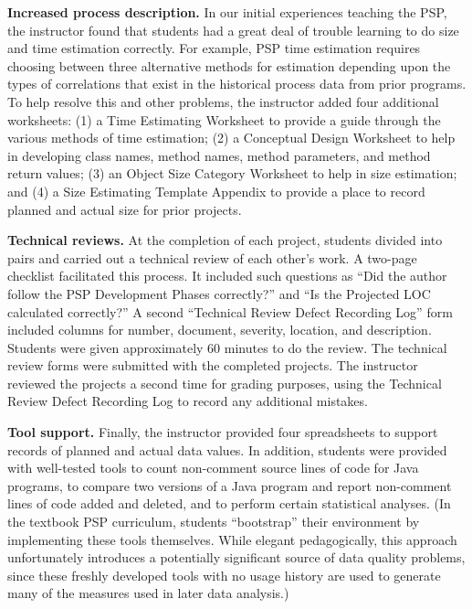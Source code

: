   {\bf Increased process description.} In our initial experiences teaching
  the PSP, the instructor found that students had a great deal of trouble
  learning to do size and time estimation correctly.  For example, PSP time
  estimation requires choosing between three alternative methods for
  estimation depending upon the types of correlations that exist in the
  historical process data from prior programs.  To help resolve this and
  other problems, the instructor added four additional worksheets: (1) a
  Time Estimating Worksheet to provide a guide through the various methods
  of time estimation; (2) a Conceptual Design Worksheet to help in
  developing class names, method names, method parameters, and method
  return values; (3) an Object Size Category Worksheet to help in size
  estimation; and (4) a Size Estimating Template Appendix to provide a
  place to record planned and actual size for prior projects.
  
  {\bf Technical reviews.} At the completion of each project, students
  divided into pairs and carried out a technical review of each other's
  work.  A two-page checklist facilitated this process.  It included such
  questions as ``Did the author follow the PSP Development Phases
  correctly?'' and ``Is the Projected LOC calculated correctly?''  A second
  ``Technical Review Defect Recording Log'' form included columns for
  number, document, severity, location, and description. Students were
  given approximately 60 minutes to do the review.  The technical review
  forms were submitted with the completed projects.  The instructor
  reviewed the projects a second time for grading purposes, using the
  Technical Review Defect Recording Log to record any additional mistakes.
  
  {\bf Tool support.} Finally, the instructor provided four spreadsheets to
  support records of planned and actual data values. In addition, students
  were provided with well-tested tools to count non-comment source lines of
  code for Java programs, to compare two versions of a Java program and
  report non-comment lines of code added and deleted, and to perform
  certain statistical analyses.  (In the textbook PSP curriculum, students
  ``bootstrap'' their environment by implementing these tools themselves.
  While elegant pedagogically, this approach unfortunately introduces a
  potentially significant source of data quality problems, since these
  freshly developed tools with no usage history are used to generate many
  of the measures used in later data analysis.)

